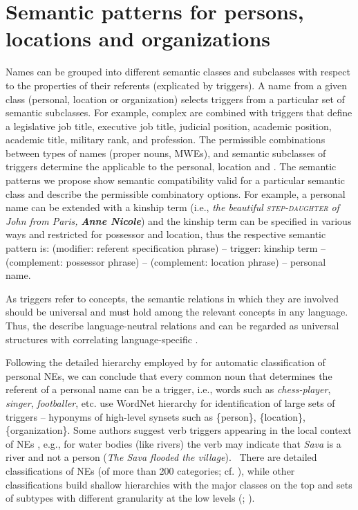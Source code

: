 \documentclass[output=paper]{langsci/langscibook}
\newcommand{\trigger}[1]{\textsc{#1}}
\begin{document}
\section{Semantic patterns for persons, locations and organizations}


Names can be grouped into different semantic classes and subclasses with
respect to the properties of their referents (explicated by triggers).
A name from a given class (personal, location or organization) selects
triggers from a particular set of semantic subclasses. For example,
complex  are combined with triggers that define a
legislative job title, executive job title, judicial position, academic
position, academic title, military rank, and profession. The
permissible combinations between types of names (proper nouns, MWEs),
and semantic subclasses of triggers determine the 
applicable to the personal, location and . The
semantic patterns we propose show semantic compatibility valid for a
particular semantic class and describe the permissible combinatory
options. For example, a personal name can be extended with a kinship
term (i.e., \textit{the beautiful
}\textit{\trigger{step-daughter}}\textit{ of John from Paris,
}\textbf{\textit{Anne Nicole}}) and the kinship term can be specified
in various ways and restricted for possessor and location, thus the
respective semantic pattern is: (modifier: referent specification
phrase) – trigger: kinship term – (complement: possessor phrase) –
(complement: location phrase) – personal name.

As triggers refer to concepts, the semantic relations in which they are
involved should be universal and must hold among the relevant concepts
in any language. Thus, the  describe language-neutral
relations and can be regarded as universal structures with correlating
language-specific .



Following the detailed hierarchy employed by \cite{giuliano2009}  for
automatic classification of personal NEs, we can conclude that every
common noun that determines the referent of a personal name can be a
trigger, i.e., words such as \textit{chess-player}, \textit{singer},
\textit{footballer}, etc. \cite{magnini2002} use WordNet hierarchy
for identification of large sets of triggers – hyponyms of high-level
synsets such as \{person\}, \{location\}, \{organization\}. Some
authors suggest verb triggers appearing in the local context of NEs
\citep{zhang2004}, e.g., for water bodies (like rivers) the verb may
indicate that \textit{Sava} is a river and not a person (\textit{The
Sava flooded the village}). \ There are detailed classifications of NEs
(of more than 200 categories; cf. \citealt{sekine2004}), while other
classifications build shallow hierarchies with the major classes on the
top and sets of subtypes with different granularity at the low levels
(\citealt{ace2008}; \citealt{fleischman2002}).
\end{document}
